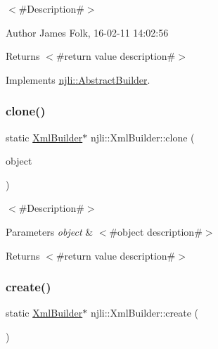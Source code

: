 $<$\#\+Description\#$>$ 

\begin{DoxyAuthor}{Author}
James Folk, 16-\/02-\/11 14\+:02\+:56
\end{DoxyAuthor}
\begin{DoxyReturn}{Returns}
$<$\#return value description\#$>$ 
\end{DoxyReturn}


Implements \mbox{\hyperlink{classnjli_1_1_abstract_builder_aa1d220053e182c37b31b427499c6eacf}{njli\+::\+Abstract\+Builder}}.

\mbox{\label{classnjli_1_1_xml_builder_adf09f255cd5bbee5c8d44162c18fc9f9}} 
\subsubsection{\texorpdfstring{clone()}{clone()}}
{\footnotesize\ttfamily static \mbox{\hyperlink{classnjli_1_1_xml_builder}{Xml\+Builder}}$\ast$ njli\+::\+Xml\+Builder\+::clone (\begin{DoxyParamCaption}\item[{const \mbox{\hyperlink{classnjli_1_1_xml_builder}{Xml\+Builder}} \&}]{object }\end{DoxyParamCaption})\hspace{0.3cm}{\ttfamily [static]}}

$<$\#\+Description\#$>$


\begin{DoxyParams}{Parameters}
{\em object} & $<$\#object description\#$>$\\
\hline
\end{DoxyParams}
\begin{DoxyReturn}{Returns}
$<$\#return value description\#$>$ 
\end{DoxyReturn}
\mbox{\label{classnjli_1_1_xml_builder_a826d245450f9ea12dac8e1ebabefcb3d}} 
\subsubsection{\texorpdfstring{create()}{create()}}
{\footnotesize\ttfamily static \mbox{\hyperlink{classnjli_1_1_xml_builder}{Xml\+Builder}}$\ast$ njli\+::\+Xml\+Builder\+::create (\begin{DoxyParamCaption}{ }\end{DoxyParamCaption})\hspace{0.3cm}{\ttfamily [static]}}

